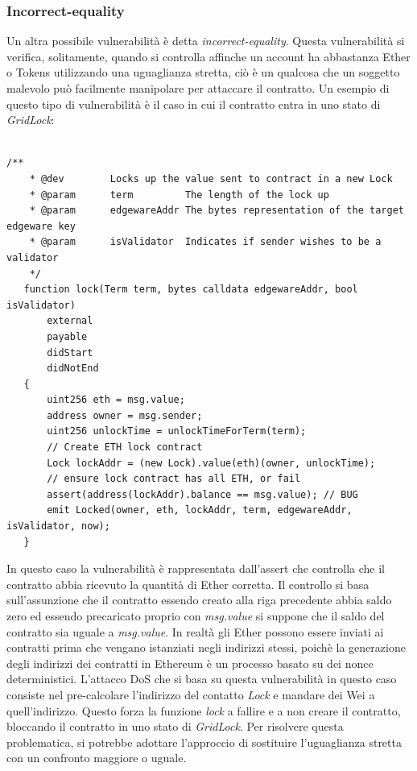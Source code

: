 \documentclass[../../Thesis.tex]{subfiles}
\begin{document}
\subsubsection*{Incorrect-equality}
Un altra possibile vulnerabilità è detta \emph{incorrect-equality}. Questa vulnerabilità si verifica, solitamente, quando si controlla affinche un account ha abbastanza Ether o Tokens utilizzando una uguaglianza stretta, ciò è un qualcosa che un soggetto malevolo può facilmente manipolare per attaccare il contratto. Un esempio di questo tipo di vulnerabilità è il caso in cui il contratto entra in uno stato di \emph{GridLock}:\\
\\
\begin{lstlisting}[language=Solidity]
    /**
    * @dev        Locks up the value sent to contract in a new Lock
    * @param      term         The length of the lock up
    * @param      edgewareAddr The bytes representation of the target edgeware key
    * @param      isValidator  Indicates if sender wishes to be a validator
    */
   function lock(Term term, bytes calldata edgewareAddr, bool isValidator)
       external
       payable
       didStart
       didNotEnd
   {
       uint256 eth = msg.value;
       address owner = msg.sender;
       uint256 unlockTime = unlockTimeForTerm(term);
       // Create ETH lock contract
       Lock lockAddr = (new Lock).value(eth)(owner, unlockTime);
       // ensure lock contract has all ETH, or fail
       assert(address(lockAddr).balance == msg.value); // BUG
       emit Locked(owner, eth, lockAddr, term, edgewareAddr, isValidator, now);
   }
\end{lstlisting}
In questo caso la vulnerabilità è rappresentata dall'assert che controlla che il contratto abbia ricevuto la quantità di Ether corretta. Il controllo si basa sull'assunzione che il contratto essendo creato alla riga precedente abbia saldo zero ed essendo precaricato proprio con \emph{msg.value} si suppone che il saldo del contratto sia uguale a \emph{msg.value}. In realtà gli Ether possono essere inviati ai contratti prima che vengano istanziati negli indirizzi stessi, poichè la generazione degli indirizzi dei contratti in Ethereum è un processo basato su dei nonce deterministici. L'attacco DoS che si basa su questa vulnerabilità in questo caso consiste nel pre-calcolare l'indirizzo del contatto \emph{Lock} e mandare dei Wei a quell'indirizzo. Questo forza la funzione \emph{lock} a fallire e a non creare il contratto, bloccando il contratto in uno stato di \emph{GridLock}.  Per risolvere questa problematica, si potrebbe adottare l'approccio di sostituire l'uguaglianza stretta con un confronto maggiore o uguale. 
\end{document}
